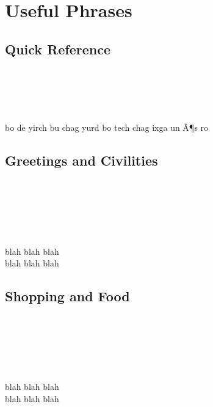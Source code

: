 \chapter{Useful Phrases}

\section*{Quick Reference}
\begin{multicols}{2}
\huge{\color{wordColor}{English}}\\
\Large

\\


\columnbreak 
\huge{\@title}\\
\Large

{bo de yirch bu chag yurd bo tech chag ixga un Ã¶s ro}\\

\end{multicols}

\section*{Greetings and Civilities}
\begin{multicols}{2}
\huge{\color{wordColor}{English}}\\
\Large

\\

\\

\columnbreak 
\huge{\@title}\\
\Large

{blah blah blah}\\

{blah blah blah}\\

\end{multicols}

\section*{Shopping and Food}
\begin{multicols}{2}
\huge{\color{wordColor}{English}}\\
\Large

\\

\\

\columnbreak 
\huge{\@title}\\
\Large

{blah blah blah}\\

{blah blah blah}\\

\end{multicols}

